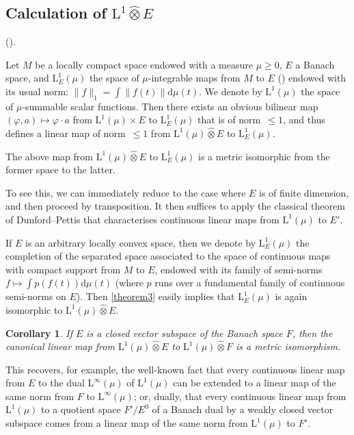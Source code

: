 \documentclass{article}
\theoremstyle{plain}
\newenvironment{theorem}[1]
    {\renewcommand\theinnercustomtheorem{#1}\innercustomtheorem}
    {\endinnercustomtheorem}
\newtheorem*{corollary}{Corollary}
\newcommand{\LL}{\mathrm{L}}
\newcommand{\hotimes}{\widehat{\otimes}}
\newcommand{\dd}{\mathrm{d}}
\newcommand{\oldpage}[1]{\marginpar{\footnotesize$\Big\vert$ \textit{p.~#1}}}
\begin{document}
\subsection{Calculation of \texorpdfstring{$\LL^1\hotimes E$}{L1E}}
\label{subsection:calculation-of-L1-hotimes-E}

(\cite[chap.~I, \S2, n\textsuperscript{o}~2]{PTT}).
\medskip

Let $M$ be a locally compact space endowed with a measure $\mu\geq0$, $E$ a Banach space, and $\LL_E^1(\mu)$ the space of $\mu$-integrable maps from $M$ to $E$ (\cite{2}) endowed with its usual norm: $\|f\|_1=\int\|f(t)\|\dd\mu(t)$.
We denote by $\LL^1(\mu)$ the space of $\mu$-summable scalar functions.
Then there exists an obvious bilinear map $(\varphi,a)\mapsto\varphi\cdot a$ from $\LL^1(\mu)\times E$ to $\LL_E^1(\mu)$ that is of norm~$\leq1$, and thus defines a linear map of norm~$\leq1$ from $\LL^1(\mu)\hotimes E$ to $\LL_E^1(\mu)$.

\begin{theorem}{3}
\label{theorem3}
  The above map from $\LL^1(\mu)\hotimes E$ to $\LL_E^1(\mu)$ is a metric isomorphic from the former space to the latter.
\end{theorem}

To see this, we can immediately reduce to the case where $E$ is of finite dimension, and then proceed by transposition.
It then suffices to apply the classical theorem of Dunford--Pettis that characterises continuous linear maps from $\LL^1(\mu)$ to $E'$.

If $E$ is an arbitrary locally convex space, then we denote by $\LL_E^1(\mu)$ the completion of the separated space associated to the space of continuous maps with compact support from $M$ to $E$, endowed with its family of semi-norms $f\mapsto\int p(f(t))\dd\mu(t)$ (where $p$ runs over a fundamental family of continuous semi-norms on $E$).
Then \cref{theorem3} easily implies that $\LL_E^1(\mu)$ is again isomorphic to $\LL^1(\mu)\hotimes E$.

\begin{corollary}
  If $E$ is a closed vector subspace of the Banach space $F$, then the canonical linear map from $\LL^1(\mu)\hotimes E$ to $\LL^1(\mu)\hotimes F$ is a metric isomorphism.
\end{corollary}

\oldpage{80}
This recovers, for example, the well-known fact that every continuous linear map from $E$ to the dual $\LL^\infty(\mu)$ of $\LL^1(\mu)$ can be extended to a linear map of the same norm from $F$ to $\LL^\infty(\mu)$;
or, dually, that every continuous linear map from $\LL^1(\mu)$ to a quotient space $F'/E^0$ of a Banach dual by a weakly closed vector subspace comes from a linear map of the same norm from $\LL^1(\mu)$ to $F'$.
\end{document}
